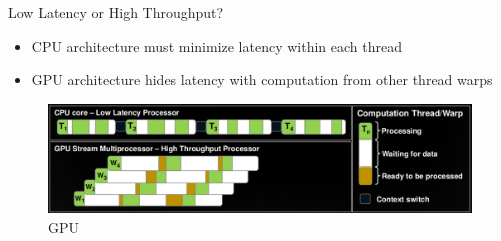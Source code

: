 \documentclass[10pt,times]{beamer}
\begin{document}
\begin{frame}{Low Latency or High Throughput?}
\begin{itemize}
\item CPU architecture must minimize latency within each thread
\item GPU architecture hides latency with computation from other thread warps
\end{itemize}
\begin{figure}
\includegraphics[width=\linewidth]{figs/CPU_GPU_Latency.png}
\caption*{GPU}
\end{figure}
\end{frame}
\end{document}
